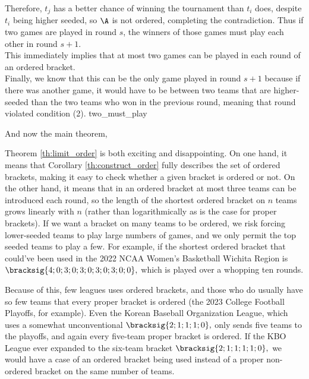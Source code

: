 {{    Therefore, $t_j$ has a better chance of winning the tournament than $t_i$ does, despite $t_i$ being higher seeded, so $\A$ is not ordered, completing the contradiction. Thus if two games are played in round $s$, the winners of those games must play each other in round $s+1.$\\

    This immediately implies that at most two games can be played in each round of an ordered bracket.\\
    
    Finally, we know that this can be the only game played in round $s+1$ because if there was another game, it would have to be between two teams that are higher-seeded than the two teams who won in the previous round, meaning that round violated condition (2).
}{two_must_play}

And now the main theorem,


Theorem \ref{th:limit_order} is both exciting and disappointing. On one hand, it means that Corollary \ref{th:construct_order} fully describes the set of ordered brackets, making it easy to check whether a given bracket is ordered or not. On the other hand, it means that in an ordered bracket at most three teams can be introduced each round, so the length of the shortest ordered bracket on $n$ teams grows linearly with $n$ (rather than logarithmically as is the case for proper brackets). If we want a bracket on many teams to be ordered, we risk forcing lower-seeded teams to play large numbers of games, and we only permit the top seeded teams to play a few. For example, if the shortest ordered bracket that could've been used in the 2022 NCAA Women's Basketball Wichita Region is $\bracksig{4; 0; 3; 0; 3; 0; 3; 0; 3; 0; 0},$ which is played over a whopping ten rounds.


Because of this, few leagues uses ordered brackets, and those who do usually have so few teams that every proper bracket is ordered (the 2023 College Football Playoffs, for example). Even the Korean Baseball Organization League, which uses a somewhat unconventional $\bracksig{2; 1; 1; 1; 0},$ only sends five teams to the playoffs, and again every five-team proper bracket is ordered. If the KBO League ever expanded to the six-team bracket $\bracksig{2; 1; 1; 1; 1; 0},$ we would have a case of an ordered bracket being used instead of a proper non-ordered bracket on the same number of teams.
}